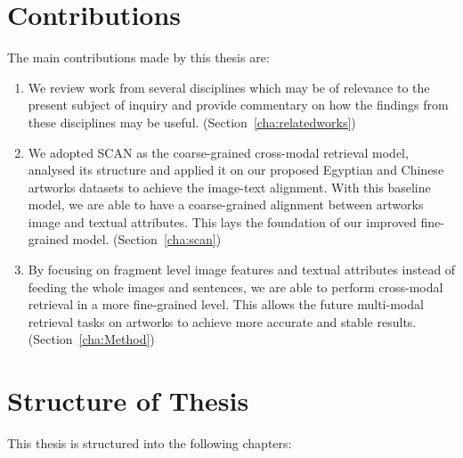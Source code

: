 \section{Contributions}
The main contributions made by this thesis are:

\begin{enumerate}
    \item We review work from several disciplines which may be of relevance to the present subject of inquiry and provide commentary on how the findings from these disciplines may be useful. (Section~\ref{cha:relatedworks})
    \item We adopted SCAN \cite{scan} as the coarse-grained cross-modal retrieval model, analysed its structure and applied it on our proposed Egyptian and Chinese artworks datasets to achieve the image-text alignment. With this baseline model, we are able to have a coarse-grained alignment between artworks image and textual attributes. This lays the foundation of our improved fine-grained model. (Section~\ref{cha:scan})
    \item By focusing on fragment level image features and textual attributes instead of feeding the whole images and sentences, we are able to perform cross-modal retrieval in a more fine-grained level. This allows the future multi-modal retrieval tasks on artworks to achieve more accurate and stable results. (Section~\ref{cha:Method})
\end{enumerate}


\section{Structure of Thesis}

This thesis is structured into the following chapters:

